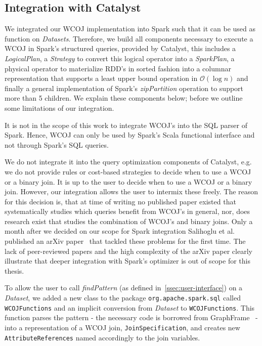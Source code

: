 \subsection{Integration with Catalyst} \label{ssec:integration-with-catalyst}
We integrated our WCOJ implementation into Spark such that it can be used as function on \textit{Datasets}.
Therefore, we build all components necessary to execute a WCOJ in Spark's structured queries, provided by Catalyst, this includes a
\textit{LogicalPlan},
a \textit{Strategy} to convert this logical operator into a \textit{SparkPlan}, a physical operator to materialize
RDD's in sorted fashion into a columnar representation that supports a least upper bound operation in $\mathcal{O} (\log n)$ and
finally a general implementation of Spark's \textit{zipPartition} operation to support more than 5 children.
We explain these components below; before we outline some limitations of our integration.

It is not in the scope of this work to integrate WCOJ's into the SQL parser of Spark.
Hence, WCOJ can only be used by Spark's Scala functional interface and not through Spark's SQL queries.

We do not integrate it into the query optimization components of Catalyst, e.g. we do not provide rules or cost-based strategies to
decide when to use a WCOJ or a binary join.
It is up to the user to decide when to use a WCOJ or a binary join.
However, our integration allows the user to intermix these freely.
The reason for this decision is, that at time of writing no published paper existed that systematically studies which queries benefit from
WCOJ's in general, nor, does research exist that studies the combination of WCOJ's and binary joins.
Only a month after we decided on our scope for Spark integration Salihoglu et al. published an arXiv paper~\cite{mhedhbi2019} that
tackled these problems for the first time.
The lack of peer-reviewed papers and the high complexity of the arXiv paper clearly illustrate that deeper integration with
Spark's optimizer is out of scope for this thesis.

To allow the user to call \textit{findPattern} (as defined in~\cref{ssec:user-interface}) on a \textit{Dataset}, we added a new class
to the package \texttt{org.apache.spark.sql} called \texttt{WCOJFunctions} and an implicit conversion from \textit{Dataset} to
\texttt{WCOJFunctions}.
This function parses the pattern - the necessary code is borrowed from GraphFrame~\cite{graphframe} - into a representation of a WCOJ join,
\texttt{JoinSpecification}, and creates new \texttt{AttributeReferences} named accordingly to the join variables.

